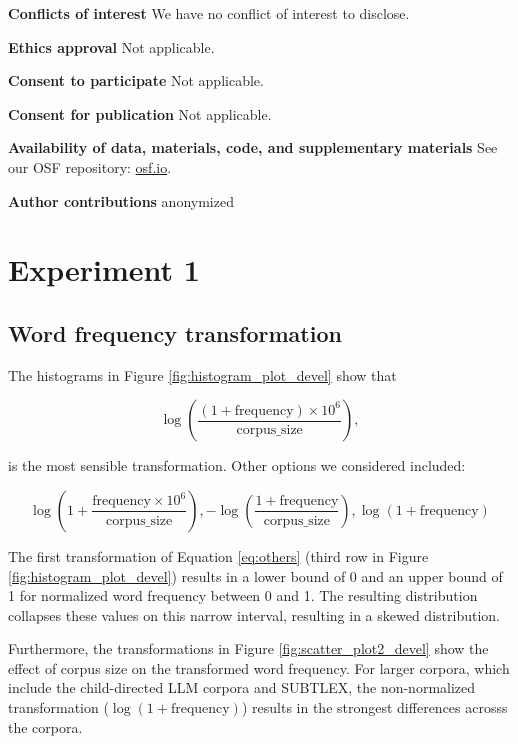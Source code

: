 \documentclass[doc, a4paper, anonymous]{apa7}
\begin{document}
\textbf{Conflicts of interest} We have no conflict of interest to disclose. 

\textbf{Ethics approval} Not applicable. 

\textbf{Consent to participate} Not applicable. 

\textbf{Consent for publication} Not applicable. 

\textbf{Availability of data, materials, code, and supplementary materials} See our OSF repository: \href{dx.doi.org/10.17605/OSF.IO/WMUVJ}{osf.io}. 

\textbf{Author contributions} anonymized


\newpage
 

\newpage

\appendix

\section{Experiment 1}

\subsection{Word frequency transformation}\label{sec:word_freq_transform}

The histograms in Figure \ref{fig:histogram_plot_devel} show that 

\begin{equation}
\log\left(\frac{(1 + \text{frequency}) \times 10^6}{\text{corpus\_size}}\right),    
\label{eq:theone}
\end{equation}

is the most sensible transformation. Other options we considered included: 

\begin{equation}
\log \left( 1 + \frac{\text{frequency} \times 10^6}{\text{corpus\_size}} \right), 
- \log \left( \frac{1 + \text{frequency}}{\text{corpus\_size}} \right), 
\log \left( 1 + \text{frequency} \right) 
\label{eq:others}
\end{equation}

The first transformation of Equation \ref{eq:others} (third row in Figure \ref{fig:histogram_plot_devel}) results in a lower bound of 0 and an upper bound of 1 for normalized word frequency between 0 and 1. The resulting distribution collapses these values on this narrow interval, resulting in a skewed distribution. 

Furthermore, the transformations in Figure \ref{fig:scatter_plot2_devel} show the effect of corpus size on the transformed word frequency. For larger corpora, which include the child-directed LLM corpora and SUBTLEX, the non-normalized transformation ($\log \left( 1 + \text{frequency} \right)$) results in the strongest differences acrosss the corpora. 
\end{document}
